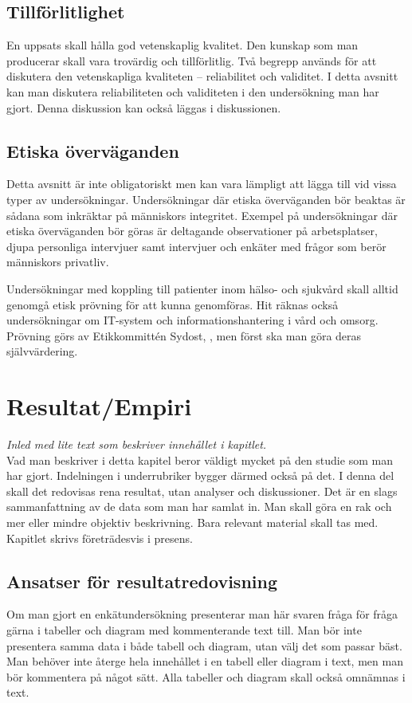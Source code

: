 \documentclass[a4paper,12pt]{article} %
\begin{document}
\subsection{Tillförlitlighet}
En uppsats skall hålla god vetenskaplig kvalitet. Den kunskap som man producerar skall vara trovärdig och tillförlitlig. Två begrepp används för att diskutera den vetenskapliga kvaliteten – reliabilitet och validitet. I detta avsnitt kan man diskutera reliabiliteten och validiteten i den undersökning man har gjort. Denna diskussion kan också läggas i diskussionen.

\subsection{Etiska överväganden}
Detta avsnitt är inte obligatoriskt men kan vara lämpligt att lägga till vid vissa typer av undersökningar. Undersökningar där etiska överväganden bör beaktas är sådana som inkräktar på människors integritet. Exempel på undersökningar där etiska överväganden bör göras är deltagande observationer på arbetsplatser, djupa personliga intervjuer samt intervjuer och enkäter med frågor som berör människors privatliv.

Undersökningar med koppling till patienter inom hälso- och sjukvård skall alltid genomgå etisk prövning för att kunna genomföras. Hit räknas också undersökningar om IT-system och informationshantering i vård och omsorg. Prövning görs av Etikkommittén Sydost, \cite{etik}, men först ska man göra deras självvärdering.

\newpage

\section{Resultat/Empiri}
\emph{Inled med lite text som beskriver innehållet i kapitlet.}\\
Vad man beskriver i detta kapitel beror väldigt mycket på den studie som man har gjort. Indelningen i underrubriker bygger därmed också på det. I denna del skall det redovisas rena resultat, utan analyser och diskussioner. Det är en slags sammanfattning av de data som man har samlat in. Man skall göra en rak och mer eller mindre objektiv beskrivning. Bara relevant material skall tas med. Kapitlet skrivs företrädesvis i presens.

\subsection{Ansatser för resultatredovisning}
Om man gjort en enkätundersökning presenterar man här svaren fråga för fråga gärna i tabeller och diagram med kommenterande text till. Man bör inte presentera samma data i både tabell och diagram, utan välj det som passar bäst. Man behöver inte återge hela innehållet i en tabell eller diagram i text, men man bör kommentera på något sätt. Alla tabeller och diagram skall också omnämnas i text.
\end{document}
